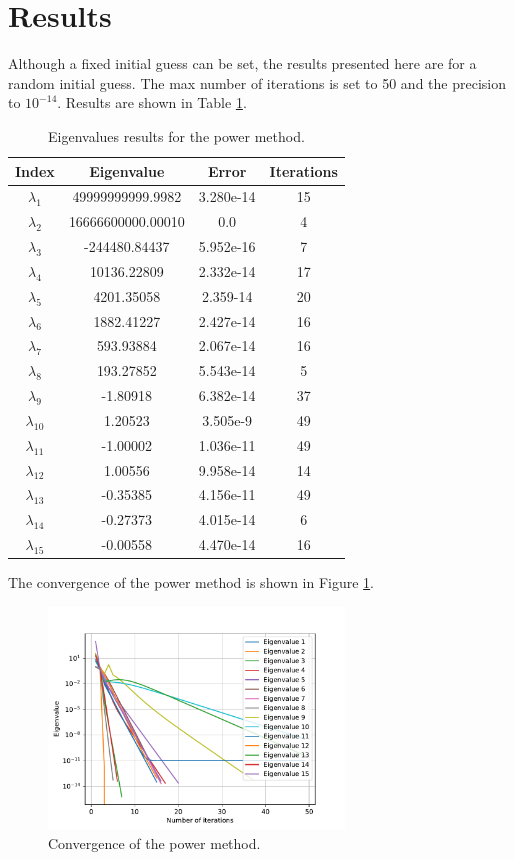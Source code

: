 \section{Results} \label{sec:results}
Although a fixed initial guess can be set, the results presented here are for a random initial guess. The max number of iterations is set to 50 and the precision to $10^{-14}$. Results are shown in Table \ref{tab:results_random}.
\begin{table}[H]
    \centering
    \caption{Eigenvalues results for the power method.}
    \label{tab:results_random}
    \begin{tabular}{cccc}
    \hline
    \textbf{Index} & \textbf{Eigenvalue} & \textbf{Error} & \textbf{Iterations} \\ \hline
    $\lambda_1$ & 49999999999.9982 & 3.280e-14 & 15 \\
    $\lambda_2$ & 16666600000.00010 & 0.0 & 4 \\
    $\lambda_3$ & -244480.84437 & 5.952e-16 & 7 \\
    $\lambda_4$ & 10136.22809 & 2.332e-14 & 17 \\ 
    $\lambda_5$ & 4201.35058 & 2.359-14 & 20 \\
    $\lambda_6$ & 1882.41227 & 2.427e-14 & 16 \\ 
    $\lambda_7$ & 593.93884 & 2.067e-14 & 16 \\ 
    $\lambda_8$ & 193.27852 & 5.543e-14 & 5 \\
    $\lambda_9$ & -1.80918 & 6.382e-14 & 37 \\
    $\lambda_{10}$ & 1.20523 & 3.505e-9 & 49 \\ 
    $\lambda_{11}$ & -1.00002 & 1.036e-11 & 49 \\
    $\lambda_{12}$ & 1.00556 & 9.958e-14 & 14 \\ 
    $\lambda_{13}$ & -0.35385 & 4.156e-11 & 49 \\
    $\lambda_{14}$ & -0.27373 & 4.015e-14 & 6 \\
    $\lambda_{15}$ & -0.00558 & 4.470e-14 & 16 \\ \hline 
    \end{tabular}
\end{table}

The convergence of the power method is shown in Figure \ref{fig:convergence}.
\begin{figure}[H]
    \centering
    \includegraphics[width=0.7\textwidth]{Figures/results_v0Variable.pdf}
    \caption{Convergence of the power method.}
    \label{fig:convergence}
\end{figure}

